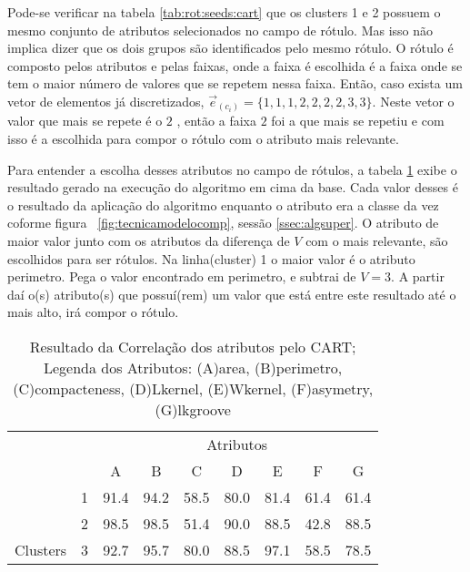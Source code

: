 Pode-se verificar na tabela \ref{tab:rot:seeds:cart} que os clusters 1 e 2 possuem o mesmo conjunto de atributos selecionados no campo de rótulo. Mas isso não implica dizer que os dois grupos são identificados pelo mesmo rótulo. O rótulo é composto pelos atributos e pelas faixas, onde a faixa é escolhida é a faixa onde se tem o maior número de valores que se repetem nessa faixa. Então, caso exista um vetor de elementos já discretizados, ${\vec{e}_{(c_i)}=\{1,1,1,2,2,2,2,3,3\}}$. Neste vetor o valor que mais se repete é o ${2}$ , então a faixa ${2}$ foi a que mais se repetiu e com isso é a escolhida para compor o rótulo com o atributo mais relevante.

Para entender a escolha desses atributos no campo de rótulos, a tabela \ref{tab:matrelevancia:seeds:cart} exibe o resultado gerado na execução do algoritmo em cima da base. Cada valor desses é o resultado da aplicação do algoritmo enquanto o atributo era a classe da vez coforme figura ~\ref{fig:tecnicamodelocomp}, sessão \ref{ssec:algsuper}. O atributo de maior valor junto com os atributos da diferença de ${V}$ com o mais relevante, são escolhidos para ser rótulos. Na linha(cluster) 1 o maior valor é o atributo perimetro. Pega o valor encontrado em perimetro, e subtrai de ${V=3}$. A partir daí o(s) atributo(s) que possuí(rem) um valor que está entre este resultado até o mais alto, irá compor o rótulo.

\begin{table}[!h]
    
    \caption{Resultado da Correlação dos atributos pelo CART; Legenda dos Atributos: (A)area, (B)perimetro, (C)compacteness, (D)Lkernel, (E)Wkernel, (F)asymetry, (G)lkgroove}    
    \centering
   \small\addtolength{\tabcolsep}{+2pt}
    \begin{tabular}{|cl|c|c|c|c|c|c|c|}
        \hline \hline
                                &   & \multicolumn{7}{c|}{Atributos}          \\ \cline{3-9} 
        \multicolumn{1}{|l}{}                            &   & A    & B & C & D & E & F & G \\ \hline
        \multicolumn{1}{|c|}{}                           & 1 & 91.4 & 94.2   & 58.5      & 80.0 & 81.4 & 61.4   & 61.4   \\ \cline{2-9} 
        \multicolumn{1}{|c|}{}                           & 2 & 98.5 & 98.5   & 51.4      & 90.0 & 88.5 & 42.8  & 88.5  \\ \cline{2-9} 
        \multicolumn{1}{|c|}{\multirow{-3}{*}{Clusters}} & 3 & 92.7 & 95.7   & 80.0      & 88.5 & 97.1 & 58.5  & 78.5  \\ \hline
    \end{tabular}
    \label{tab:matrelevancia:seeds:cart} 
\end{table}

